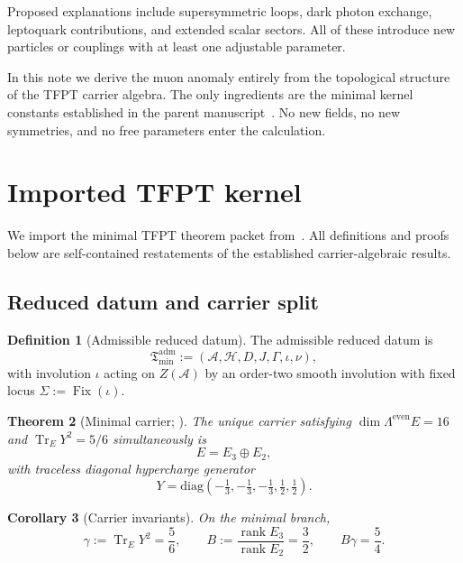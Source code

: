 \documentclass[11pt,a4paper]{article}
\newtheorem{theorem}{Theorem}[section]
\newtheorem{corollary}[theorem]{Corollary}
\theoremstyle{definition}
\newtheorem{definition}[theorem]{Definition}
\theoremstyle{remark}
\DeclareMathOperator{\Fix}{Fix}
\DeclareMathOperator{\tr}{Tr}
\DeclareMathOperator{\rank}{rank}
\newcommand{\Seam}{\Sigma}
\newcommand{\inv}{\iota}
\newcommand{\Tmin}{\mathfrak T_{\mathrm{min}}}
\newcommand{\gammaY}{\gamma}
\numberwithin{equation}{section}
\begin{document}
Proposed explanations include supersymmetric loops, dark photon exchange,
leptoquark contributions, and extended scalar sectors. All of these introduce
new particles or couplings with at least one adjustable parameter.

In this note we derive the muon anomaly entirely from the topological
structure of the TFPT carrier algebra. The only ingredients are the
minimal kernel constants established in the parent manuscript~\cite{TFPT31}.
No new fields, no new symmetries, and no free parameters enter the
calculation.

\section{Imported TFPT kernel}\label{sec:kernel}

We import the minimal TFPT theorem packet from~\cite{TFPT31,TFPTkernel}.
All definitions and proofs below are self-contained restatements of the
established carrier-algebraic results.

\subsection{Reduced datum and carrier split}

\begin{definition}[Admissible reduced datum]\label{def:reduced-datum}
The admissible reduced datum is
\[
\Tmin^{\mathrm{adm}}:=(\mathcal A,\mathcal H,D,J,\Gamma,\inv,\nu),
\]
with involution $\inv$ acting on $Z(\mathcal A)$ by an order-two smooth
involution with fixed locus $\Seam:=\Fix(\inv)$.
\end{definition}

\begin{theorem}[Minimal carrier; {\cite[Theorem~2.1]{TFPTkernel}}]
\label{thm:minimal-carrier}
The unique carrier satisfying $\dim\Lambda^{\mathrm{even}}E=16$ and
$\tr_EY^2=5/6$ simultaneously is
\[
E=E_3\oplus E_2,
\]
with traceless diagonal hypercharge generator
\[
Y=\mathrm{diag}\!\left(-\tfrac13,-\tfrac13,-\tfrac13,\tfrac12,\tfrac12\right).
\]
\end{theorem}

\begin{corollary}[Carrier invariants]\label{cor:carrier-invariants}
On the minimal branch,
\begin{equation}\label{eq:carrier-invariants}
\gammaY:=\tr_EY^2=\frac56,
\qquad
B:=\frac{\rank E_3}{\rank E_2}=\frac32,
\qquad
B\gammaY=\frac54.
\end{equation}
\end{corollary}
\end{document}

